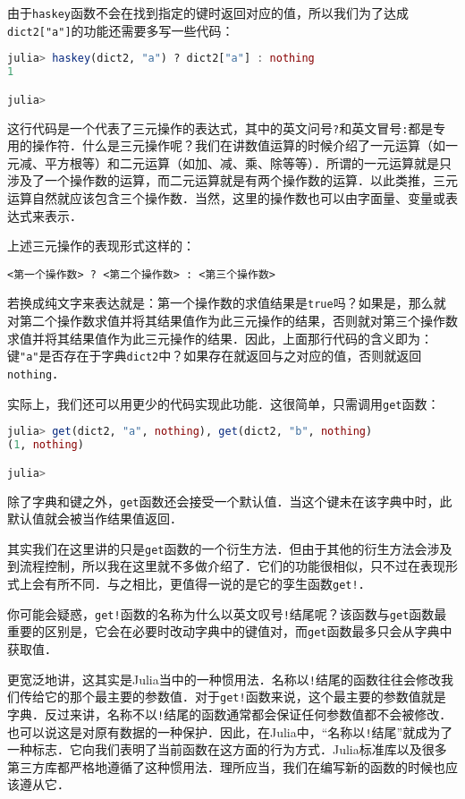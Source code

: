 由于\verb|haskey|函数不会在找到指定的键时返回对应的值，所以我们为了达成\verb|dict2["a"]|的功能还需要多写一些代码：
\begin{lstlisting}[language=julia]
julia> haskey(dict2, "a") ? dict2["a"] : nothing
1

julia> 
\end{lstlisting}

这行代码是一个代表了三元操作的表达式，其中的英文问号\verb|?|和英文冒号\verb|:|都是专用的操作符．什么是三元操作呢？我们在讲数值运算的时候介绍了一元运算（如一元减、平方根等）和二元运算（如加、减、乘、除等等）．所谓的一元运算就是只涉及了一个操作数的运算，而二元运算就是有两个操作数的运算．以此类推，三元运算自然就应该包含三个操作数．当然，这里的操作数也可以由字面量、变量或表达式来表示．

上述三元操作的表现形式这样的：
\begin{lstlisting}
<第一个操作数> ? <第二个操作数> : <第三个操作数>
\end{lstlisting}


若换成纯文字来表达就是：第一个操作数的求值结果是\verb|true|吗？如果是，那么就对第二个操作数求值并将其结果值作为此三元操作的结果，否则就对第三个操作数求值并将其结果值作为此三元操作的结果．因此，上面那行代码的含义即为：键\verb|"a"|是否存在于字典\verb|dict2|中？如果存在就返回与之对应的值，否则就返回\verb|nothing|．

实际上，我们还可以用更少的代码实现此功能．这很简单，只需调用\verb|get|函数：
\begin{lstlisting}[language=julia]
julia> get(dict2, "a", nothing), get(dict2, "b", nothing)
(1, nothing)

julia> 
\end{lstlisting}

除了字典和键之外，\verb|get|函数还会接受一个默认值．当这个键未在该字典中时，此默认值就会被当作结果值返回．

其实我们在这里讲的只是\verb|get|函数的一个衍生方法．但由于其他的衍生方法会涉及到流程控制，所以我在这里就不多做介绍了．它们的功能很相似，只不过在表现形式上会有所不同．与之相比，更值得一说的是它的孪生函数\verb|get!|．

你可能会疑惑，\verb|get!|函数的名称为什么以英文叹号\verb|!|结尾呢？该函数与\verb|get|函数最重要的区别是，它会在必要时改动字典中的键值对，而\verb|get|函数最多只会从字典中获取值．

更宽泛地讲，这其实是Julia当中的一种惯用法．名称以\verb|!|结尾的函数往往会修改我们传给它的那个最主要的参数值．对于\verb|get!|函数来说，这个最主要的参数值就是字典．反过来讲，名称不以\verb|!|结尾的函数通常都会保证任何参数值都不会被修改．也可以说这是对原有数据的一种保护．因此，在Julia中，“名称以\verb|!|结尾”就成为了一种标志．它向我们表明了当前函数在这方面的行为方式．Julia标准库以及很多第三方库都严格地遵循了这种惯用法．理所应当，我们在编写新的函数的时候也应该遵从它．

